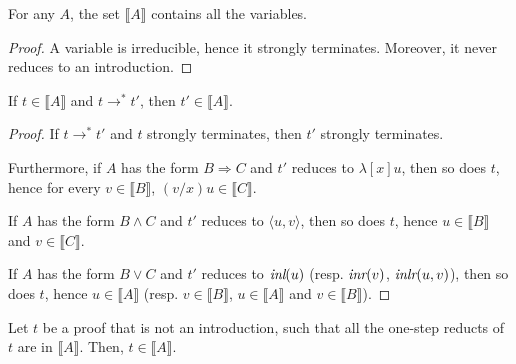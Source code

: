 \documentclass[screen, sigconf,authorversion,nonacm]{acmart}
\theoremstyle{acmdefinition}
\numberwithin{equation}{section}
\newcommand\abstr[1]{[#1]}
\newcommand\inl{\mbox{\it inl}}
\newcommand\inr{\mbox{\it inr}}
\newcommand\inlr{\mbox{\it inlr}}
\newcommand\pair[2]{\langle #1, #2 \rangle}
\begin{document}
\begin{proposition}[Variables]
\label{Var}
For any $A$, the set $\llbracket A \rrbracket$ contains all the variables.
\end{proposition}

\begin{proof}
A variable is irreducible, hence it strongly terminates. Moreover, it
never reduces to an introduction.
\qedhere
\end{proof}   

\begin{proposition}
\label{closure}
If $t \in \llbracket A \rrbracket$ and $t \longrightarrow^* t'$, then 
$t' \in \llbracket A \rrbracket$.
\end{proposition}

\begin{proof}
If $t \longrightarrow^* t'$ and $t$ strongly terminates, then $t'$
strongly terminates.

Furthermore, if $A$ has the form $B \Rightarrow C$ and $t'$ reduces to
$\lambda \abstr{x}u$, then so does $t$, hence for every $v \in \llbracket B
\rrbracket$, $(v/x)u \in \llbracket C \rrbracket$.

If $A$ has the form $B \wedge C$ and $t'$ reduces to $\pair{u}{v}$,
then so does $t$, hence $u \in \llbracket B \rrbracket$ and $v \in
\llbracket C \rrbracket$.

If $A$ has the form $B \vee C$ and $t'$ reduces to $\inl(u)$
(resp. $\inr(v)$, $\inlr(u,v)$), then so does $t$, hence
$u \in   \llbracket A \rrbracket$ (resp. $v \in \llbracket B \rrbracket$,
$u \in   \llbracket A \rrbracket$ and $v \in \llbracket B \rrbracket$).
\qedhere
\end{proof}

\begin{proposition}
\label{CR3}
Let $t$ be a proof that is not an introduction, 
such that all the one-step reducts of $t$
are in $\llbracket A \rrbracket$. Then, $t \in \llbracket A \rrbracket$.
\end{proposition}
\end{document}
